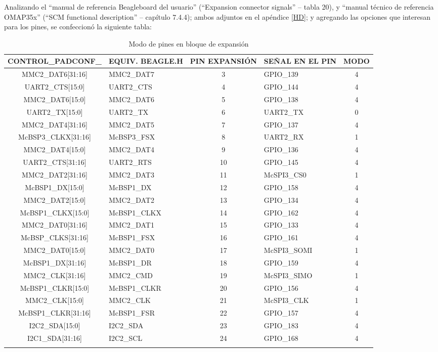 Analizando el “manual de referencia Beagleboard del usuario” (“Expansion connector signals” – tabla 20), y “manual técnico de referencia OMAP35x” (“SCM functional description” – capítulo 7.4.4); ambos adjuntos en el apéndice \ref{HD}; y agregando las opciones que interesan para los pines, se confeccionó la siguiente tabla: 

\begin{longtable}{|c|p{2.6cm}|c|p{2.5cm}|c|}
\hline
\textbf{CONTROL\_PADCONF\_} & \textbf{EQUIV. BEAGLE.H} & \textbf{PIN EXPANSIÓN} & \textbf{SEÑAL EN EL PIN} & \textbf{MODO} \\ \hline
MMC2\_DAT6[31:16] & MMC2\_DAT7 & 3 & GPIO\_139 & 4 \\ \hline
UART2\_CTS[15:0] & UART2\_CTS & 4 & GPIO\_144 & 4 \\ \hline
MMC2\_DAT6[15:0] & MMC2\_DAT6 & 5 & GPIO\_138 & 4 \\ \hline
UART2\_TX[15:0] & UART2\_TX & 6 & UART2\_TX & 0 \\ \hline
MMC2\_DAT4[31:16] & MMC2\_DAT5 & 7 & GPIO\_137 & 4 \\ \hline
McBSP3\_CLKX[31:16] & McBSP3\_FSX & 8 & UART2\_RX & 1 \\ \hline
MMC2\_DAT4[15:0] & MMC2\_DAT4 & 9 & GPIO\_136 & 4 \\ \hline
UART2\_CTS[31:16] & UART2\_RTS & 10 & GPIO\_145 & 4 \\ \hline
MMC2\_DAT2[31:16] & MMC2\_DAT3 & 11 & McSPI3\_CS0 & 1 \\ \hline
McBSP1\_DX[15:0] & McBSP1\_DX & 12 & GPIO\_158 & 4 \\ \hline
MMC2\_DAT2[15:0] & MMC2\_DAT2 & 13 & GPIO\_134 & 4 \\ \hline
McBSP1\_CLKX[15:0] & McBSP1\_CLKX & 14 & GPIO\_162 & 4 \\ \hline
MMC2\_DAT0[31:16] & MMC2\_DAT1 & 15 & GPIO\_133 & 4 \\ \hline
McBSP\_CLKS[31:16] & McBSP1\_FSX & 16 & GPIO\_161 & 4 \\ \hline
MMC2\_DAT0[15:0] & MMC2\_DAT0 & 17 & McSPI3\_SOMI & 1 \\ \hline
McBSP1\_DX[31:16] & McBSP1\_DR & 18 & GPIO\_159 & 4 \\ \hline
MMC2\_CLK[31:16] & MMC2\_CMD & 19 & McSPI3\_SIMO & 1 \\ \hline
McBSP1\_CLKR[15:0] & McBSP1\_CLKR & 20 & GPIO\_156 & 4 \\ \hline
MMC2\_CLK[15:0] & MMC2\_CLK & 21 & McSPI3\_CLK & 1 \\ \hline
McBSP1\_CLKR[31:16] & McBSP1\_FSR & 22 & GPIO\_157 & 4 \\ \hline
I2C2\_SDA[15:0] & I2C2\_SDA & 23 & GPIO\_183 & 4 \\ \hline
I2C1\_SDA[31:16] & I2C2\_SCL & 24 & GPIO\_168 & 4 \\ \hline
\caption{Modo de pines en bloque de expansión}\label{pines}
\end{longtable}

